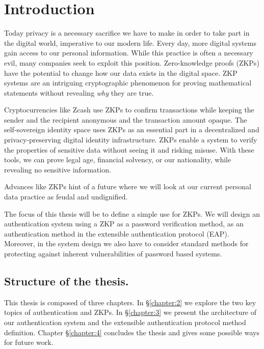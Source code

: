 \newpage
\chapter{Introduction}
\thispagestyle{fancy}
\label{chapter:1}

\noindent
Today privacy is a necessary sacrifice we have to make in order to take part in the digital world, imperative to our modern life.
Every day, more digital systems gain access to our personal information. While this practice is often a necessary evil, many companies seek to exploit this position.
Zero-knowledge proofs (ZKPs) have the potential to change how our data exists in the digital space. 
ZKP systems are an intriguing cryptographic phenomenon for proving mathematical statements without revealing \textit{why} they are true.

Cryptocurrencies like Zcash \cite{hopwood2016zcash} use ZKPs to confirm transactions while keeping the sender and the recipient anonymous and the transaction amount opaque.
The self-sovereign identity space \cite{tobin2016inevitable} uses ZKPs as an essential part in a decentralized and privacy-preserving digital identity infrastructure.
ZKPs enable a system to verify the properties \cite{10.1007/978-3-540-89255-7_15} of sensitive data without seeing it and risking misuse. With these tools, we can prove legal age, financial solvency, or our nationality, while revealing no sensitive information.

Advances like ZKPs hint of a future where we will look at our current personal data practice as feudal and undignified.

\bigskip
\noindent
The focus of this thesis will be to define a simple use for ZKPs.
We will design an authentication system using a ZKP as a password verification method, as an authentication method in the extensible authentication protocol (EAP).
Moreover, in the system design we also have to consider standard methods for protecting against inherent vulnerabilities of password based systems.
\section{Structure of the thesis.}
This thesis is composed of three chapters.
In \S\ref{chapter:2} we explore the two key topics of authentication and ZKPs.
In \S\ref{chapter:3} we present the architecture of our authentication system and the extensible authentication protocol method definition.
Chapter \S\ref{chapter:4} concludes the thesis and gives some possible ways for future work.

\newpage